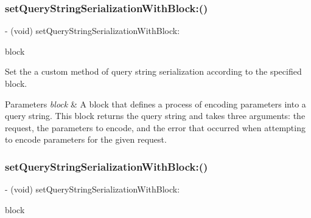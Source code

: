 \subsubsection{\texorpdfstring{set\+Query\+String\+Serialization\+With\+Block\+:()}{setQueryStringSerializationWithBlock:()}\hspace{0.1cm}{\footnotesize\ttfamily [1/3]}}
{\footnotesize\ttfamily -\/ (void) set\+Query\+String\+Serialization\+With\+Block\+: \begin{DoxyParamCaption}\item[{(nullable N\+S\+String $\ast$($^\wedge$)(N\+S\+U\+R\+L\+Request $\ast$request, id parameters, N\+S\+Error $\ast$\+\_\+\+\_\+autoreleasing $\ast$error))}]{block }\end{DoxyParamCaption}}

Set the a custom method of query string serialization according to the specified block.


\begin{DoxyParams}{Parameters}
{\em block} & A block that defines a process of encoding parameters into a query string. This block returns the query string and takes three arguments\+: the request, the parameters to encode, and the error that occurred when attempting to encode parameters for the given request. \\
\hline
\end{DoxyParams}
\mbox{\label{interface_a_f_h_t_t_p_request_serializer_a3b30fd73d2913d6c86ac338f79a88c68}} 
\subsubsection{\texorpdfstring{set\+Query\+String\+Serialization\+With\+Block\+:()}{setQueryStringSerializationWithBlock:()}\hspace{0.1cm}{\footnotesize\ttfamily [2/3]}}
{\footnotesize\ttfamily -\/ (void) set\+Query\+String\+Serialization\+With\+Block\+: \begin{DoxyParamCaption}\item[{(nullable N\+S\+String $\ast$($^\wedge$)(N\+S\+U\+R\+L\+Request $\ast$request, id parameters, N\+S\+Error $\ast$\+\_\+\+\_\+autoreleasing $\ast$error))}]{block }\end{DoxyParamCaption}}

